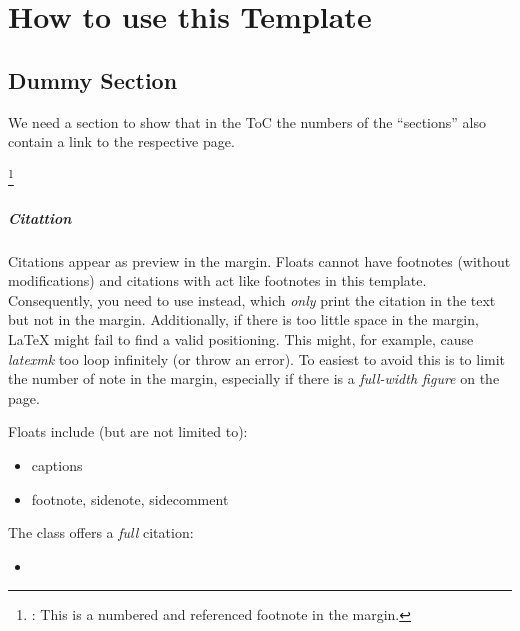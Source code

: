 


\cleardoublepage
\chapter{How to use this Template}

\section{Dummy Section}

We need a section to show that in the ToC the numbers of the ``sections'' also contain a link to the respective page.


\lipsum[1-1]%
\footnote{\detokenize{\footnote}: This is a numbered and referenced footnote in the margin.} 
\lipsum[2-2]%


\paragraph{Citattion}

Citations \cite{cryptoeprint:2021/1484} appear as preview in the margin. 
Floats cannot have footnotes (without modifications) and citations with \detokenize{\cite} act like footnotes in this template. 
Consequently, 
you need to use \detokenize{\citeonly} instead, 
which \emph{only} print the citation in the text but not in the margin. 
Additionally, 
if there is too little space in the margin, 
LaTeX might fail to find a valid positioning. 
This might, for example, cause \emph{latexmk} too loop infinitely (or throw an error). 
To easiest to avoid this is to limit the number of note in the margin, especially if there is a \emph{full-width figure} on the page.


Floats include (but are not limited to):
\begin{itemize}
	\item captions
	\item footnote, sidenote, sidecomment
\end{itemize}

The class offers a \emph{full} citation:
\begin{itemize}
 	\item \detokenize{\fullfullcite}
 \end{itemize} 


